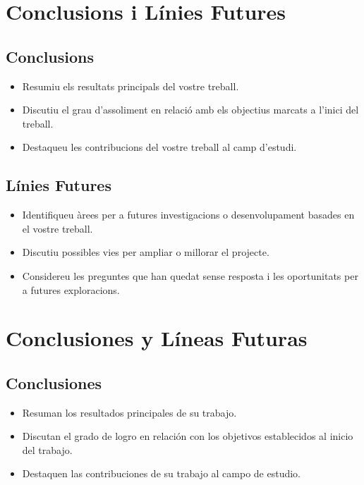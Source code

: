 
\ifcase\doclanguage\or
\chapter{Conclusions i Línies Futures}
  \section{Conclusions}
    \begin{itemize}
      \item Resumiu els resultats principals del vostre treball.
      \item Discutiu el grau d'assoliment en relació amb els objectius marcats a l'inici del treball.
      \item Destaqueu les contribucions del vostre treball al camp d'estudi.
    \end{itemize}
  
  \section{Línies Futures}
    \begin{itemize}
      \item Identifiqueu àrees per a futures investigacions o desenvolupament basades en el vostre treball.
      \item Discutiu possibles vies per ampliar o millorar el projecte.
      \item Considereu les preguntes que han quedat sense resposta i les oportunitats per a futures exploracions.
    \end{itemize}

\or
\chapter{Conclusiones y Líneas Futuras}
  \section{Conclusiones}
    \begin{itemize}
      \item Resuman los resultados principales de su trabajo.
      \item Discutan el grado de logro en relación con los objetivos establecidos al inicio del trabajo.
      \item Destaquen las contribuciones de su trabajo al campo de estudio.
    \end{itemize}
  
